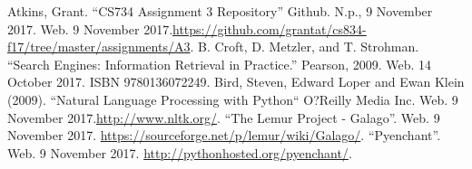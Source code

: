 \documentclass[letterpaper,11pt]{article}
\begin{document}
\begin{thebibliography}{9}
Atkins, Grant. ``CS734 Assignment 3 Repository'' Github. N.p., 9 November 2017. Web. 9 November 2017.\url{https://github.com/grantat/cs834-f17/tree/master/assignments/A3}.
B. Croft, D. Metzler, and T. Strohman. ``Search Engines: Information Retrieval in Practice.'' Pearson, 2009. Web. 14 October 2017. ISBN 9780136072249.
Bird, Steven, Edward Loper and Ewan Klein (2009). ``Natural Language Processing with Python`` O?Reilly Media Inc. Web. 9 November 2017.\url{http://www.nltk.org/}.
``The Lemur Project - Galago''. Web. 9 November 2017. \url{https://sourceforge.net/p/lemur/wiki/Galago/}.
``Pyenchant''. Web. 9 November 2017. \url{http://pythonhosted.org/pyenchant/}.
\end{thebibliography}
\end{document}
